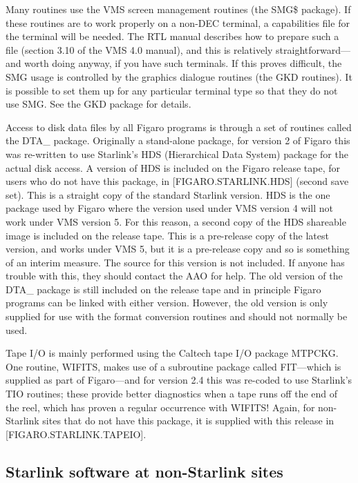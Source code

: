 Many routines use the VMS screen management routines (the SMG\$ package).  If
these routines are to work properly on a non-DEC terminal, a capabilities file
for the terminal will be needed. The RTL manual  describes how to prepare such
a file (section 3.10 of the VMS 4.0 manual), and this is relatively
straightforward---and worth doing anyway, if you have such terminals. If this
proves difficult, the SMG usage is controlled by the graphics dialogue routines
(the GKD routines). It is possible to set them up for any particular terminal
type so that they do not use SMG. See the GKD package for details.

Access to disk data files by all Figaro programs is through a set of routines
called the DTA\_ package. Originally a stand-alone package, for version 2 of
Figaro this was re-written to use Starlink's HDS (Hierarchical Data System)
package for the actual disk access. A version of HDS is included on the Figaro
release tape, for users who do not have this package, in [FIGARO.STARLINK.HDS]
(second save set). This is a straight copy of the standard Starlink version.
HDS is the one package used by Figaro where the version used under VMS version
4 will not work under VMS version 5. For this reason, a second copy of the HDS
shareable image is included on the release tape. This is a pre-release copy of
the latest version, and works under VMS 5, but it is a pre-release copy and so
is something of an interim measure. The source for this version is not
included. If anyone has trouble with this,  they should contact the AAO for
help. The old version of the DTA\_ package is still included on the release
tape and in principle Figaro programs can be linked with either version.
However, the old version is only supplied for use with the format conversion
routines and should not normally be used.

Tape I/O is mainly performed using the Caltech tape I/O package MTPCKG. One
routine, WIFITS, makes use of a subroutine package called FIT---which is
supplied as part of Figaro---and for version 2.4 this was re-coded to use
Starlink's TIO routines; these provide better diagnostics when a tape runs off
the end of the reel, which has proven a regular occurrence with WIFITS!  Again,
for non-Starlink sites that do not have this package, it is  supplied with this
release in [FIGARO.STARLINK.TAPEIO].

\subsection{Starlink software at non-Starlink sites}

